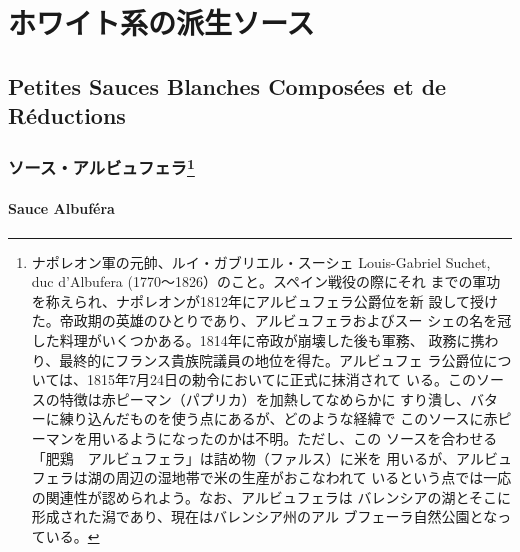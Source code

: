 \hypertarget{ux30dbux30efux30a4ux30c8ux7cfbux306eux6d3eux751fux30bdux30fcux30b9}{%
\section{ホワイト系の派生ソース}\label{ux30dbux30efux30a4ux30c8ux7cfbux306eux6d3eux751fux30bdux30fcux30b9}}

\hypertarget{petites-sauces-blanches-composuxe9es-et-de-ruxe9ductions}{%
\subsection{Petites Sauces Blanches Composées et de
Réductions}\label{petites-sauces-blanches-composuxe9es-et-de-ruxe9ductions}}

\maeaki
\begin{recette}
\hypertarget{ux30bdux30fcux30b9ux30a2ux30ebux30d3ux30e5ux30d5ux30a7ux30e91}{%
\subsubsection[ソース・アルビュフェラ]{\texorpdfstring{ソース・アルビュフェラ\footnote{ナポレオン軍の元帥、ルイ・ガブリエル・スーシェ
  Louis-Gabriel Suchet, duc d'Albufera
  (1770〜1826）のこと。スペイン戦役の際にそれ
  までの軍功を称えられ、ナポレオンが1812年にアルビュフェラ公爵位を新
  設して授けた。帝政期の英雄のひとりであり、アルビュフェラおよびスー
  シェの名を冠した料理がいくつかある。1814年に帝政が崩壊した後も軍務、
  政務に携わり、最終的にフランス貴族院議員の地位を得た。アルビュフェ
  ラ公爵位については、1815年7月24日の勅令においてに正式に抹消されて
  いる。このソースの特徴は赤ピーマン（パプリカ）を加熱してなめらかに
  すり潰し、バターに練り込んだものを使う点にあるが、どのような経緯で
  このソースに赤ピーマンを用いるようになったのかは不明。ただし、この
  ソースを合わせる「肥鶏　アルビュフェラ」は詰め物（ファルス）に米を
  用いるが、アルビュフェラは湖の周辺の湿地帯で米の生産がおこなわれて
  いるという点では一応の関連性が認められよう。なお、アルビュフェラは
  バレンシアの湖とそこに形成された潟であり、現在はバレンシア州のアル
  ブフェーラ自然公園となっている。}}{ソース・アルビュフェラ}}\label{ux30bdux30fcux30b9ux30a2ux30ebux30d3ux30e5ux30d5ux30a7ux30e91}}

\hypertarget{sauce-albufera}{%
\paragraph{Sauce Albuféra}\label{sauce-albufera}}


\end{recette}
